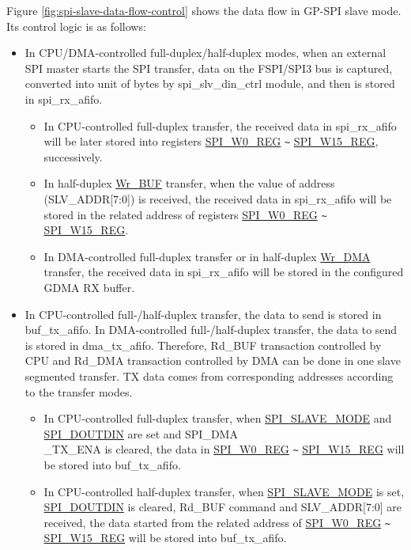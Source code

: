 \documentclass[main\_\_EN.tex]{subfiles}
\begin{document}
Figure \ref{fig:spi-slave-data-flow-control} shows the data flow in GP-SPI slave mode. Its control logic is as follows:
\begin{itemize}
    \item In CPU/DMA-controlled full-duplex/half-duplex modes, when an external SPI master starts the SPI transfer, data on the FSPI/SPI3 bus is captured, converted into unit of bytes by spi\_slv\_din\_ctrl module, and then is stored in spi\_rx\_afifo.
    \begin{itemize}
        \item In CPU-controlled full-duplex transfer, the received data in spi\_rx\_afifo will be later stored into registers \hyperref[regdesc:SPIW0REG]{SPI\_W0\_REG}  \verb+~+ \hyperref[regdesc:SPIW15REG]{SPI\_W15\_REG}, successively.

        \item In half-duplex \hyperref[cmd:wrbuf]{Wr\_BUF} transfer, when the value of address (SLV\_ADDR[7:0]) is received, the received data in spi\_rx\_afifo will be stored in the related address of registers \hyperref[regdesc:SPIW0REG]{SPI\_W0\_REG}  \verb+~+ \hyperref[regdesc:SPIW15REG]{SPI\_W15\_REG}.

        \item In DMA-controlled full-duplex transfer or in half-duplex \hyperref[cmd:wrdma]{Wr\_DMA} transfer, the received data in spi\_rx\_afifo will be stored in the configured GDMA RX buffer.

    \end{itemize}

    \item In CPU-controlled full-/half-duplex transfer, the data to send is stored in buf\_tx\_afifo. In DMA-controlled full-/half-duplex transfer, the data to send is stored in dma\_tx\_afifo. Therefore, Rd\_BUF transaction controlled by CPU and Rd\_DMA transaction controlled by DMA can be done in one slave segmented transfer. TX data comes from corresponding addresses according to the transfer modes.
    \begin{itemize}
        \item In CPU-controlled full-duplex transfer, when \hyperref[fielddesc:SPISLAVEMODE]{SPI\_SLAVE\_MODE} and \hyperref[fielddesc:SPIDOUTDIN]{SPI\_DOUTDIN} are set and SPI\_DMA\\\_TX\_ENA is cleared, the data in \hyperref[regdesc:SPIW0REG]{SPI\_W0\_REG} \verb+~+ \hyperref[regdesc:SPIW15REG]{SPI\_W15\_REG} will be stored into buf\_tx\_afifo.

        \item In CPU-controlled half-duplex transfer, when \hyperref[fielddesc:SPISLAVEMODE]{SPI\_SLAVE\_MODE} is set, \hyperref[fielddesc:SPIDOUTDIN]{SPI\_DOUTDIN} is cleared, Rd\_BUF command and SLV\_ADDR[7:0] are received, the data started from the related address of \hyperref[regdesc:SPIW0REG]{SPI\_W0\_REG} \verb+~+ \hyperref[regdesc:SPIW15REG]{SPI\_W15\_REG} will be stored into buf\_tx\_afifo.


\end{itemize}
\end{itemize}
\end{document}
